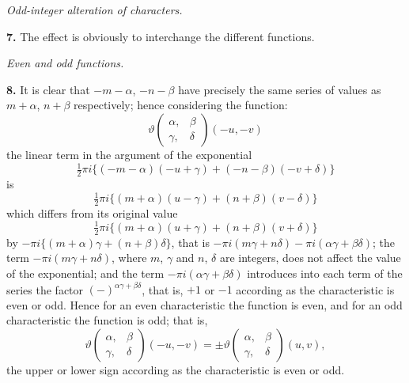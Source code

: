 \documentclass[11pt,a4paper]{book}
\begin{document}
\vspace{1em}

\begin{center}
\textit{Odd-integer alteration of characters.}
\end{center}

\vspace{0.5em}

\noindent\textbf{7.}\quad
The effect is obviously to interchange the different functions.

\vspace{1em}

\begin{center}
\textit{Even and odd functions.}
\end{center}

\vspace{0.5em}

\noindent\textbf{8.}\quad
It is clear that $-m - \alpha$, $-n - \beta$ have precisely the same series of values as $m + \alpha$, $n + \beta$ respectively; hence considering the function:
\[
\vartheta\begin{pmatrix} \alpha, & \beta \\ \gamma, & \delta \end{pmatrix}(-u, -v)
\]
the linear term in the argument of the exponential
\[
\tfrac{1}{2}\pi i\{(-m - \alpha)(-u + \gamma) + (-n - \beta)(-v + \delta)\}
\]
is
\[
\tfrac{1}{2}\pi i\{(m + \alpha)(u - \gamma) + (n + \beta)(v - \delta)\}
\]
which differs from its original value
\[
\tfrac{1}{2}\pi i\{(m + \alpha)(u + \gamma) + (n + \beta)(v + \delta)\}
\]
by $-\pi i\{(m + \alpha)\gamma + (n + \beta)\delta\}$, that is $-\pi i(m\gamma + n\delta) - \pi i(\alpha\gamma + \beta\delta)$; the term $-\pi i(m\gamma + n\delta)$, where $m$, $\gamma$ and $n$, $\delta$ are integers, does not affect the value of the exponential; and the term $-\pi i(\alpha\gamma + \beta\delta)$ introduces into each term of the series the factor $(-)^{\alpha\gamma + \beta\delta}$, that is, $+1$ or $-1$ according as the characteristic is even or odd. Hence for an even characteristic the function is even, and for an odd characteristic the function is odd; that is,
\[
\vartheta\begin{pmatrix} \alpha, & \beta \\ \gamma, & \delta \end{pmatrix}(-u, -v) = \pm\vartheta\begin{pmatrix} \alpha, & \beta \\ \gamma, & \delta \end{pmatrix}(u, v),
\]
the upper or lower sign according as the characteristic is even or odd.
\end{document}
